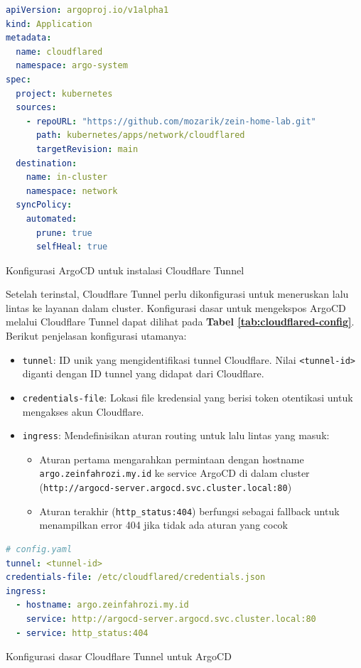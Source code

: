 \begin{table}[H]
  \centering
  \begin{minipage}{0.95\linewidth}
    \begin{lstlisting}[language=yaml, basicstyle=\footnotesize\ttfamily]
apiVersion: argoproj.io/v1alpha1
kind: Application
metadata:
  name: cloudflared
  namespace: argo-system
spec:
  project: kubernetes
  sources:
    - repoURL: "https://github.com/mozarik/zein-home-lab.git"
      path: kubernetes/apps/network/cloudflared
      targetRevision: main
  destination:
    name: in-cluster
    namespace: network
  syncPolicy:
    automated:
      prune: true
      selfHeal: true
    \end{lstlisting}
  \end{minipage}
  \caption{Konfigurasi ArgoCD untuk instalasi Cloudflare Tunnel}
  \label{tab:cloudflared-argocd}
\end{table}

Setelah terinstal, Cloudflare Tunnel perlu dikonfigurasi untuk meneruskan lalu
lintas ke layanan dalam cluster. Konfigurasi dasar untuk mengekspos ArgoCD
melalui Cloudflare Tunnel dapat dilihat pada \textbf{Tabel
  \ref{tab:cloudflared-config}}. Berikut penjelasan konfigurasi utamanya:

\begin{itemize}
  \item \texttt{tunnel}: ID unik yang mengidentifikasi tunnel Cloudflare. Nilai \texttt{<tunnel-id>} diganti dengan ID tunnel yang didapat dari Cloudflare.
  \item \texttt{credentials-file}: Lokasi file kredensial yang berisi token otentikasi untuk mengakses akun Cloudflare.
  \item \texttt{ingress}: Mendefinisikan aturan routing untuk lalu lintas yang masuk:
        \begin{itemize}
          \item Aturan pertama mengarahkan permintaan dengan hostname
                \texttt{argo.zeinfahrozi.my.id} ke service ArgoCD di dalam cluster
                (\texttt{http://argocd-server.argocd.svc.cluster.local:80})
          \item Aturan terakhir (\texttt{http\_status:404}) berfungsi sebagai fallback untuk
                menampilkan error 404 jika tidak ada aturan yang cocok
        \end{itemize}
\end{itemize}

\begin{table}[H]
  \centering
  \begin{minipage}{0.95\linewidth}
    \begin{lstlisting}[language=yaml, basicstyle=\footnotesize\ttfamily]
# config.yaml
tunnel: <tunnel-id>
credentials-file: /etc/cloudflared/credentials.json
ingress:
  - hostname: argo.zeinfahrozi.my.id
    service: http://argocd-server.argocd.svc.cluster.local:80
  - service: http_status:404
    \end{lstlisting}
  \end{minipage}
  \caption{Konfigurasi dasar Cloudflare Tunnel untuk ArgoCD}
  \label{tab:cloudflared-config}
\end{table}

